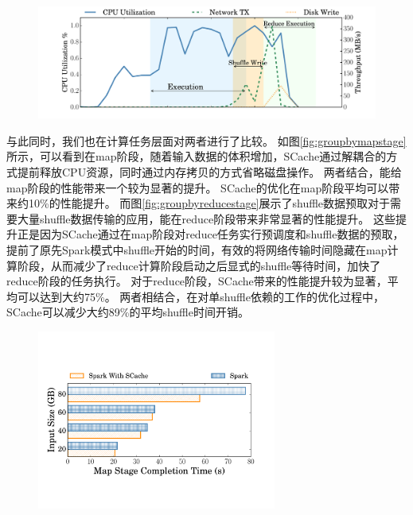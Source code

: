 \begin{figure}[!htp]
	\centering
	\includegraphics[width=\textwidth]{../../PPoPP-2018/fig/scache_util.pdf}
\end{figure}

与此同时，我们也在计算任务层面对两者进行了比较。
如图\ref{fig:groupbymapstage}所示，可以看到在map阶段，随着输入数据的体积增加，SCache通过解耦合的方式提前释放CPU资源，同时通过内存拷贝的方式省略磁盘操作。
两者结合，能给map阶段的性能带来一个较为显著的提升。
SCache的优化在map阶段平均可以带来约10\%的性能提升。
而图\ref{fig:groupbyreducestage}展示了shuffle数据预取对于需要大量shuffle数据传输的应用，能在reduce阶段带来非常显著的性能提升。
这些提升正是因为SCache通过在map阶段对reduce任务实行预调度和shuffle数据的预取，提前了原先Spark模式中shuffle开始的时间，有效的将网络传输时间隐藏在map计算阶段，从而减少了reduce计算阶段启动之后显式的shuffle等待时间，加快了reduce阶段的任务执行。
对于reduce阶段，SCache带来的性能提升较为显著，平均可以达到大约75\%。
两者相结合，在对单shuffle依赖的工作的优化过程中，SCache可以减少大约89\%的平均shuffle时间开销。

\begin{figure}[!htp]
	\centering
	\includegraphics[width=0.7\textwidth]{../../PPoPP-2018/fig/groupbymapstage.pdf}
\end{figure}

